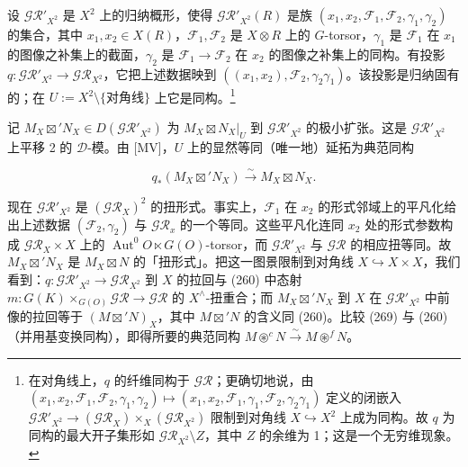 设 $\mathcal{GR}'_{X^{2}}$ 是 $X^{2}$ 上的归纳概形，使得 $\mathcal{GR}'_{X^{2}}(R)$ 是族 $(x_1,x_2,\mathcal{F}_1,\mathcal{F}_2,\gamma_1,\gamma_2)$ 的集合，其中 $x_1,x_2\in X(R)$，$\mathcal{F}_1,\mathcal{F}_2$ 是 $X\otimes R$ 上的 $G$-torsor，$\gamma_1$ 是 $\mathcal{F}_1$ 在 $x_1$ 的图像之补集上的截面，$\gamma_2$ 是 $\mathcal{F}_1\to\mathcal{F}_2$ 在 $x_2$ 的图像之补集上的同构。有投影 $q:\mathcal{GR}'_{X^{2}}\to\mathcal{GR}_{X^{2}}$，它把上述数据映到 $((x_1,x_2),\mathcal{F}_2,\gamma_2\gamma_1)$。该投影是归纳固有的；在 $U:=X^{2}\setminus\{\text{对角线}\}$ 上它是同构。\footnote{在对角线上，$q$ 的纤维同构于 $\mathcal{GR}$；更确切地说，由 $(x_1,x_2,\mathcal{F}_1,\mathcal{F}_2,\gamma_1,\gamma_2)\mapsto(x_1,x_2,\mathcal{F}_1,\gamma_1,\mathcal{F}_2,\gamma_2\gamma_1)$ 定义的闭嵌入 $\mathcal{GR}'_{X^{2}}\to(\mathcal{GR}_X)\times_X(\mathcal{GR}_{X^{2}})$ 限制到对角线 $X\hookrightarrow X^{2}$ 上成为同构。故 $q$ 为同构的最大开子集形如 $\mathcal{GR}_{X^{2}}\setminus Z$，其中 $Z$ 的余维为 1；这是一个无穷维现象。}

记 $M_X\boxtimes'N_X\in D(\mathcal{GR}'_{X^{2}})$ 为 $M_X\boxtimes N_X|_U$ 到 $\mathcal{GR}'_{X^{2}}$ 的极小扩张。这是 $\mathcal{GR}'_{X^{2}}$ 上平移 2 的 $\mathcal{D}$-模。由 [MV]，$U$ 上的显然等同（唯一地）延拓为典范同构

\begin{equation}\tag{269}
q_{*}(M_X\boxtimes'N_X)\xrightarrow{\sim}M_X\boxtimes N_X.
\end{equation}

现在 $\mathcal{GR}'_{X^{2}}$ 是 $(\mathcal{GR}_X)^{2}$ 的扭形式。事实上，$\mathcal{F}_1$ 在 $x_2$ 的形式邻域上的平凡化给出上述数据 $(\mathcal{F}_2,\gamma_2)$ 与 $\mathcal{GR}_x$ 的一个等同。这些平凡化连同 $x_2$ 处的形式参数构成 $\mathcal{GR}_X\times X$ 上的 $\operatorname{Aut}^{0}O\ltimes G(O)$-torsor，而 $\mathcal{GR}'_{X^{2}}$ 与 $\mathcal{GR}$ 的相应扭等同。故 $M_X\boxtimes'N_X$ 是 $M_X\boxtimes N$ 的「扭形式」。把这一图景限制到对角线 $X\hookrightarrow X\times X$，我们看到：$q:\mathcal{GR}'_{X^{2}}\to\mathcal{GR}_{X^{2}}$ 到 $X$ 的拉回与 (260) 中态射 $m:G(K)\times_{G(O)}\mathcal{GR}\to\mathcal{GR}$ 的 $X^{\wedge}$-扭重合；而 $M_X\boxtimes'N_X$ 到 $X$ 在 $\mathcal{GR}'_{X^{2}}$ 中前像的拉回等于 $(M\boxtimes'N)_X$，其中 $M\boxtimes'N$ 的含义同 (260)。比较 (269) 与 (260)（并用基变换同构），即得所要的典范同构 $M\circledast^{c}N\xrightarrow{\sim}M\circledast^{f}N$。

